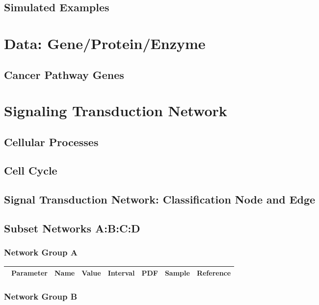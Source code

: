 \documentclass[preprint, 8pt]{elsarticle}
\theoremstyle{definition}
\begin{document}
\subsection{Simulated Examples}

\section{Data: Gene/Protein/Enzyme}

\subsection{Cancer Pathway Genes}

\section{Signaling Transduction Network}

\subsection{Cellular Processes}

\subsection{Cell Cycle}
\subsection{Signal Transduction Network: Classification Node and Edge}

\subsection{Subset Networks A:B:C:D}

\subsubsection{Network Group A}

\begin{table}[H]\centering
\begin{tabular}{p{1cm}p{1cm}p{1cm}p{1cm}p{1cm}p{1cm}p{4cm}}\
Parameter & Name & Value & Interval & PDF & Sample & Reference \\
\hline
\hline
\end{tabular}
\end{table}

\subsubsection{Network Group B}
\end{document}
